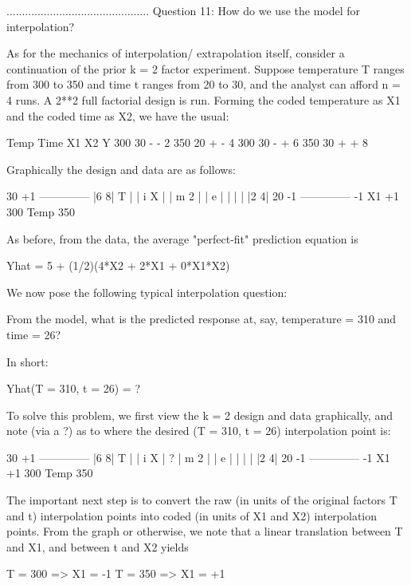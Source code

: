 ..............................................
Question 11: How do we use the model for interpolation?

As for the mechanics of interpolation/
extrapolation itself, consider a continuation of
the prior k = 2 factor experiment.  Suppose
temperature T ranges from 300 to 350 and time t
ranges from 20 to 30, and the analyst can afford n
= 4 runs.  A 2**2 full factorial design is run.
Forming the coded temperature as X1 and the coded
time as X2, we have the usual:

        Temp    Time    X1     X2     Y
         300     30     -      -      2
         350     20     +      -      4
         300     30     -      +      6
         350     30     +      +      8

Graphically the design and data are as follows:

    30 +1 --------------
          |6          8|
     T    |            |
     i  X |            |
     m  2 |            |
     e    |            |
          |            |
          |2          4|
    20 -1 --------------
          -1    X1    +1
          300  Temp  350

As before, from the data, the average
"perfect-fit" prediction equation is

   Yhat = 5 + (1/2)(4*X2 + 2*X1 + 0*X1*X2)

We now pose the following typical interpolation
question:

   From the model, what is the predicted response
   at, say, temperature = 310 and time = 26?

In short:

   Yhat(T = 310, t = 26) = ?

To solve this problem, we first view the k = 2
design and data graphically, and note (via a ?) as
to where the desired (T = 310, t = 26)
interpolation point is:

    30 +1 --------------
          |6          8|
     T    |            |
     i  X |  ?         |
     m  2 |            |
     e    |            |
          |            |
          |2          4|
    20 -1 --------------
          -1    X1    +1
          300  Temp  350

The important next step is to convert the raw (in
units of the original factors T and t)
interpolation points into coded (in units of X1
and X2) interpolation points.  From the graph or
otherwise, we note that a linear translation
between T and X1, and between t and X2 yields

   T = 300 => X1 = -1
   T = 350 => X1 = +1

